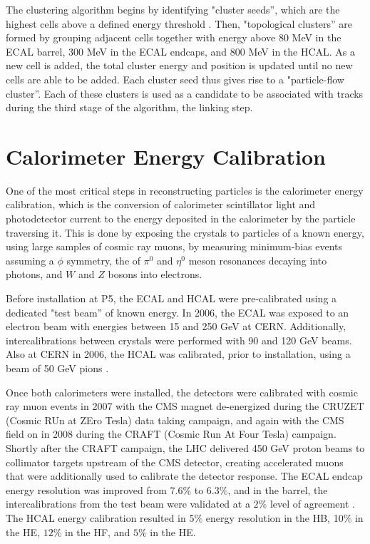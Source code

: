 \par The clustering algorithm begins by identifying "cluster seeds'',
which are the highest \PT cells above a defined energy threshold
\cite{CMS-PAS-PFT-09-001}.  Then, "topological clusters'' are formed
by grouping adjacent cells together with energy above 80 MeV in the
ECAL barrel, 300 MeV in the ECAL endcaps, and 800 MeV in the HCAL.
As a new cell is added, the total cluster energy and position is
updated until no new cells are able to be added.  Each cluster seed
thus gives rise to a "particle-flow cluster''.  Each of these clusters
is used as a candidate to be associated with tracks during the third
stage of the algorithm, the linking step.  


\section{Calorimeter Energy Calibration}
\label{energy_calibration_overview}

\par One of the most critical steps in reconstructing particles is the
calorimeter energy calibration, which is the conversion of calorimeter
scintillator light and photodetector current to the energy deposited
in the calorimeter by the particle traversing it.  This is done by
exposing the crystals to particles of a known energy, using large
samples of cosmic ray muons, by measuring minimum-bias events assuming
a $\phi$ symmetry, the of $\pi^{0}$ and $\eta^{0}$ meson resonances
decaying into photons, and $W$ and $Z$ bosons into electrons.   

\par Before installation at P5, the ECAL and HCAL were pre-calibrated
using a dedicated "test beam'' of known energy.  In 2006,
the ECAL was exposed to an electron beam with 
energies between 15 and 250 GeV \cite{Adzic:2008zza} at CERN.
Additionally, intercalibrations between crystals were performed with 90
and 120 GeV beams.  Also at CERN in 2006, the HCAL was calibrated,
prior to installation, using a beam of 50 GeV pions
\cite{Cankocak:1127315}. 

\par Once both calorimeters were installed, the detectors were
calibrated with cosmic ray muon events in 2007 with the CMS magnet
de-energized during the CRUZET (Cosmic RUn at ZEro Tesla) data taking
campaign, and again with the CMS field on in 2008 during the CRAFT
(Cosmic Run At Four Tesla) campaign.  Shortly after the CRAFT
campaign, the LHC delivered 450 GeV proton beams to collimator targets
upstream of the CMS detector, creating accelerated muons that were
additionally used to calibrate the detector response.  The ECAL endcap
energy resolution was improved from 7.6$\%$ to 6.3$\%$, and in the
barrel, the intercalibrations from the test beam were validated at a
$2\%$ level of agreement \cite{Malberti:1358839}.  The HCAL energy
calibration resulted in 5$\%$ energy resolution in the HB, 10$\%$ in
the HE, $12\%$ in the HF, and $5\%$ in the
HE\cite{Chatrchyan:1223950}.  

